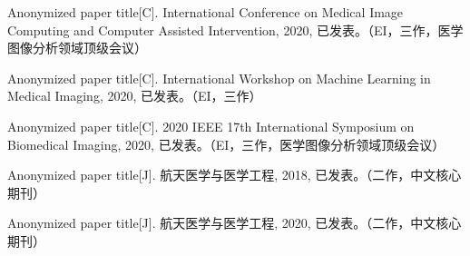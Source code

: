 {        \noindent [11] Anonymized paper title[C]. International Conference on Medical Image Computing and Computer Assisted Intervention, 2020, 已发表。（EI，三作，医学图像分析领域顶级会议）
        
        \noindent [12] Anonymized paper title[C]. International Workshop on Machine Learning in Medical Imaging, 2020, 已发表。（EI，三作）
        
        \noindent [13] Anonymized paper title[C]. 2020 IEEE 17th International Symposium on Biomedical Imaging, 2020, 已发表。（EI，三作，医学图像分析领域顶级会议）
        
        \noindent [14] Anonymized paper title[J]. 航天医学与医学工程, 2018, 已发表。（二作，中文核心期刊）
        
        \noindent [15] Anonymized paper title[J]. 航天医学与医学工程, 2020, 已发表。（二作，中文核心期刊）
        }
        
        
        
